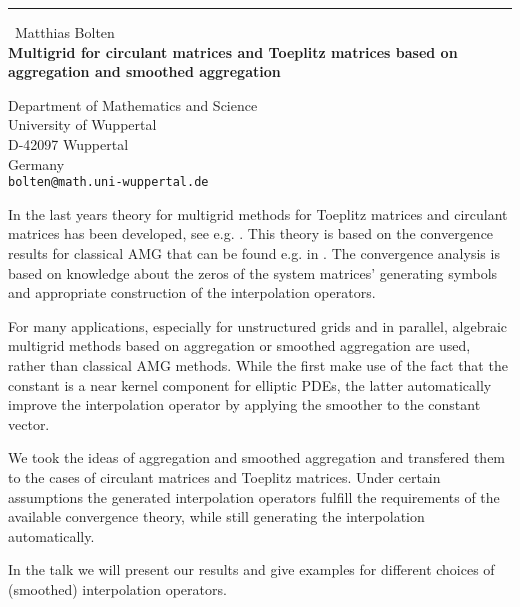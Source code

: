 \documentclass{report}
\begin{document}
\begin{center}
\rule{6in}{1pt} \
{\large Matthias Bolten \\
{\bf Multigrid for circulant matrices and Toeplitz matrices based on aggregation and smoothed aggregation}}

Department of Mathematics and Science \\ University of Wuppertal \\ D-42097 Wuppertal \\ Germany
\\
{\tt bolten@math.uni-wuppertal.de}\end{center}

In the last years theory for multigrid methods for Toeplitz matrices and
circulant matrices has been developed, see e.g. \cite{art:FIOR91,
art:SERR04, art:ARIC07}. This theory is based on the convergence results
for classical AMG that can be found e.g. in \cite{inc:RUGE87}. The
convergence analysis is based on knowledge about the zeros of the system
matrices' generating symbols and appropriate construction of the
interpolation operators.

For many applications, especially for unstructured grids and in parallel,
algebraic multigrid methods based on aggregation \cite{art:BRAE95} or
smoothed aggregation \cite{art:VANE96} are used, rather than classical
AMG methods. While the first make use of the fact that the constant is a
near kernel component for elliptic PDEs, the latter automatically improve
the interpolation operator by applying the smoother to the constant
vector.

We took the ideas of aggregation and smoothed aggregation and transfered
them to the cases of circulant matrices and Toeplitz matrices. Under
certain assumptions the generated interpolation operators fulfill the
requirements of the available convergence theory, while still generating
the interpolation automatically.

In the talk we will present our results and give examples for different
choices of (smoothed) interpolation operators.
\end{document}
